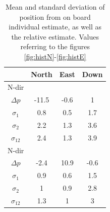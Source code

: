 \begin{table}[h!]
  \begin{center}
    \begin{tabular}{|c|c|c|c|}\hline
		& \textbf{North} & \textbf{East}& \textbf{Down}\\
      \hline
      	N-dir \\ \hline
      	$\Delta p$& -11.5 & -0.6 & 1\\ \hline
		$\sigma_1$& 0.8 & 0.5 & 1.7 \\\hline
		$\sigma_2$ & 2.2 & 1.3 & 3.6 \\ \hline
		$\sigma_{12}$& 2.4 & 1.3 & 3.9 \\ \hline
		N-dir\\ \hline
		$\Delta p$& -2.4& 10.9 & -0.6 \\ \hline
		$\sigma_1$& 0.9 & 0.6 & 1.5 \\\hline
		$\sigma_2$ & 1 & 0.9 & 2.8 \\ \hline
		$\sigma_{12}$ & 1.3 & 1 & 3 \\ \hline
    \end{tabular}
    \caption{\label{table:resultsHistIS} Mean and standard deviation of position from on board individual estimate, as well as the relative estimate. Values referring to the figures \ref{fig:histN}-\ref{fig:histE}}
  \end{center}
\end{table}

